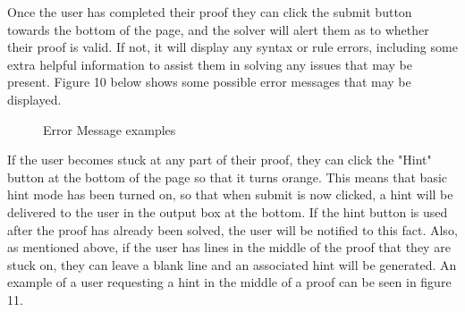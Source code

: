 Once the user has completed their proof they can click the submit button towards the bottom of the page, and the solver will alert them as to whether their proof is valid. If not, it will display any syntax or rule errors, including some extra helpful information to assist them in solving any issues that may be present. Figure 10 below shows some possible error messages that may be displayed.
\pagebreak

\begin{figure}[!ht]
	\centering
	\caption{Error Message examples}
\end{figure}

If the user becomes stuck at any part of their proof, they can click the "Hint" button at the bottom of the page so that it turns orange. This means that basic hint mode has been turned on, so that when submit is now clicked, a hint will be delivered to the user in the output box at the bottom. If the hint button is used after the proof has already been solved, the user will be notified to this fact. Also, as mentioned above, if the user has lines in the middle of the proof that they are stuck on, they can leave a blank line and an associated hint will be generated. An example of a user requesting a hint in the middle of a proof can be seen in figure 11.

